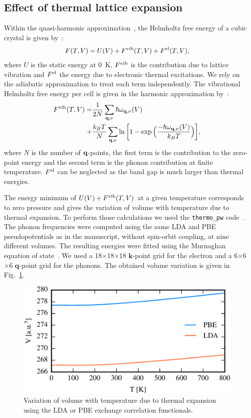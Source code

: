\documentclass[aps,prl,twocolumn,superscriptaddress]{revtex4-1}
\begin{document}
\subsection{Effect of thermal lattice expansion}

Within the quasi-harmonic approximation~\cite{Baroni2010}, the Helmholtz free energy of a 
cubic crystal is given by~\cite{Palumbo2017}:
\begin{equation}
F(T,V) = U(V) + F^{\rm{vib}}(T,V) + F^{\rm{el}}(T,V),
\end{equation}
where $U$ is the static energy at 0~K, $F^{\rm{vib}}$ is the contribution due to lattice vibration 
and $F^{\rm{el}}$ the energy due to electronic thermal excitations. 
We rely on the adiabatic approximation to treat each term independently. 
The vibrational Helmholtz free energy per cell is given in the harmonic approximation by~\cite{Palumbo2017}: 
\begin{align}
F^{\rm{vib}}(T,V) =& \frac{1}{2N} \sum_{\mathbf{q},\nu} \hbar \omega_{\mathbf{q},\nu}(V) \nonumber \\
+& \frac{k_B T}{N}  \sum_{\mathbf{q},\nu} \ln \bigg[ 1 - \exp\Big( \frac{-\hbar \omega_{\mathbf{q},\nu}(V)}{k_B T} \Big) \bigg],
\end{align}
where $N$ is the number of $\bf q$-points, the first term is the contribution to the zero-point energy and the second term is the 
phonon contribution at finite temperature. $F^{\rm{el}}$ can be neglected as the band
gap is much larger than thermal energies.

The energy minimum of $U(V) + F^{\rm{vib}}(T,V)$ at a given temperature corresponds to zero pressure and gives the variation of volume
with temperature due to thermal expansion. 
To perform those calculations we used the \texttt{thermo\_pw} code~\cite{thermopw,Corso2016}.
The phonon frequencies were computed using the same LDA and PBE pseudopotentials as in the manuscript, without spin-orbit coupling, at nine different volumes. The resulting energies were fitted using the Murnaghan equation of state~\cite{Murnaghan1944}. 
We used a 18$\times$18$\times$18 $\mathbf{k}$-point grid for the electron and a 6$\times$6$\times$6 $\mathbf{q}$-point grid for the phonons. 
The obtained volume variation is given in Fig.~\ref{figS4}.

\begin{figure}
  \centering
  \includegraphics[width=\columnwidth]{figS4.pdf}
  \caption{\label{figS4}
  Variation of volume with temperature due to thermal expansion using the LDA or PBE exchange correlation functionals.
  }
\end{figure}
\end{document}
